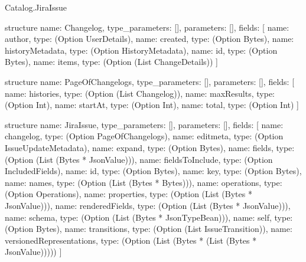 \begin{lexlean}{Catalog.JiraIssue}
\begin{semanticmodule}
structure{
  name: Changelog,
  type_parameters: [],
  parameters: [],
  fields: [
    {name: author, type: (Option UserDetails)},
    {name: created, type: (Option Bytes)},
    {name: historyMetadata, type: (Option HistoryMetadata)},
    {name: id, type: (Option Bytes)},
    {name: items, type: (Option (List ChangeDetails))}
  ]
}

structure{
  name: PageOfChangelogs,
  type_parameters: [],
  parameters: [],
  fields: [
    {name: histories, type: (Option (List Changelog))},
    {name: maxResults, type: (Option Int)},
    {name: startAt, type: (Option Int)},
    {name: total, type: (Option Int)}
  ]
}

structure{
  name: JiraIssue,
  type_parameters: [],
  parameters: [],
  fields: [
    {name: changelog, type: (Option PageOfChangelogs)},
    {name: editmeta, type: (Option IssueUpdateMetadata)},
    {name: expand, type: (Option Bytes)},
    {name: fields, type: (Option (List (Bytes * JsonValue)))},
    {name: fieldsToInclude, type: (Option IncludedFields)},
    {name: id, type: (Option Bytes)},
    {name: key, type: (Option Bytes)},
    {name: names, type: (Option (List (Bytes * Bytes)))},
    {name: operations, type: (Option Operations)},
    {name: properties, type: (Option (List (Bytes * JsonValue)))},
    {name: renderedFields, type: (Option (List (Bytes * JsonValue)))},
    {name: schema, type: (Option (List (Bytes * JsonTypeBean)))},
    {name: self, type: (Option Bytes)},
    {name: transitions, type: (Option (List IssueTransition))},
    {name: versionedRepresentations, type: (Option (List (Bytes * (List (Bytes * JsonValue)))))}
  ]
}
\end{semanticmodule}
\end{lexlean}
